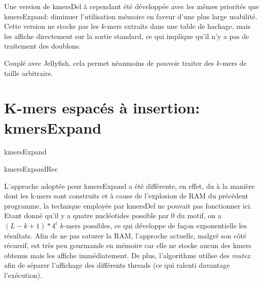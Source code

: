 \documentclass{report}
\begin{document}
      Une version de kmersDel à cependant été développée avec les mêmes priorités que kmersExpand: diminuer l'utilisation mémoire en faveur d'une plus large usabilité. Cette version ne stocke pas les $k$-mers extraits dans une table de hachage, mais les affiche directement sur la sortie standard, ce qui implique qu'il n'y a pas de traitement des doublons.

      Couplé avec Jellyfish, cela permet néanmoins de pouvoir traiter des $k$-mers de taille arbitraire.
    \section{K-mers espacés à insertion: kmersExpand}
      \normalsize
      \begin{algorithm}[H]{
        \caption{kmersExpand}
      }\end{algorithm}
      \begin{algorithm}[H]{
        \caption{kmersExpandRec}
      }\end{algorithm}\bigskip
      \large
      L'approche adoptée pour kmersExpand a été différente, en effet, du à la manière dont les k-mers sont construits et à cause de l'explosion de RAM du précédent programme, la technique employée par kmersDel ne pouvait pas fonctionner ici.\\

      Etant donné qu'il y a quatre nucléotides possible par $0$ du motif, on a $(L - k + 1 )*4^t$ $k$-mers possibles, ce qui développe de façon exponentielle les résultats. Afin de ne pas saturer la RAM, l'approche actuelle, malgré son côté récursif, est très peu gourmande en mémoire car elle ne stocke aucun des kmers obtenus mais les affiche immédiatement. De plus, l'algorithme utilise des \textit{mutex} afin de séparer l'affichage des différents threads (ce qui ralenti davantage l'exécution).\\
\end{document}
